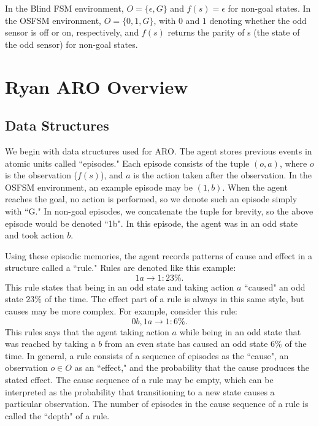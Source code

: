 \documentclass[letterpaper]{article} %
\begin{document}
In the Blind FSM environment, $O = \{\epsilon, G\}$ and $f(s) = \epsilon$ for non-goal states. In the OSFSM environment, $O = \{0, 1, G\}$, with $0$ and $1$ denoting whether the odd sensor is off or on, respectively, and $f(s)$ returns the parity of s (the state of the odd sensor) for non-goal states.

\section{Ryan ARO Overview}


\subsection{Data Structures}

We begin with data structures used for ARO. The agent stores previous events in atomic units called ``episodes." Each episode consists of the tuple $(o, a)$, where $o$ is the observation ($f(s)$), and $a$ is the action taken after the observation. In the OSFSM environment, an example episode may be $(1,b)$. When the agent reaches the goal, no action is performed, so we denote such an episode simply with ``G." In non-goal episodes, we concatenate the tuple for brevity, so the above episode would be denoted ``1b". In this episode, the agent was in an odd state and took action $b$.

Using these episodic memories, the agent records patterns of cause and effect in a structure called a ``rule." Rules are denoted like this example: $$1a \rightarrow 1: 23\%.$$ This rule states that being in an odd state and taking action $a$ ``caused" an odd state $23\%$ of the time. The effect part of a rule is always in this same style, but causes may be more complex. For example, consider this rule: $$0b,1a \rightarrow 1: 6\%.$$ This rules says that the agent taking action $a$ while being in an odd state that was reached by taking a $b$ from an even state has caused an odd state $6\%$ of the time. In general, a rule consists of a sequence of episodes as the ``cause", an observation $o \in O$ as an ``effect," and the probability that the cause produces the stated effect. The cause sequence of a rule may be empty, which can be interpreted as the probability  that transitioning to a new state causes a particular observation. The number of episodes in the cause sequence of a rule is called the ``depth" of a rule.
\end{document}
